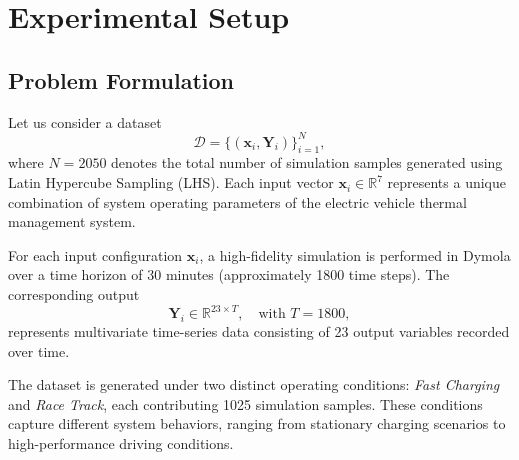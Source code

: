 \chapter{Experimental Setup}


\section{Problem Formulation}

Let us consider a dataset 
\[
\mathcal{D} = \{(\mathbf{x}_i, \mathbf{Y}_i)\}_{i=1}^{N},
\]
where \( N = 2050 \) denotes the total number of simulation samples generated using Latin Hypercube Sampling (LHS). Each input vector \( \mathbf{x}_i \in \mathbb{R}^7 \) represents a unique combination of system operating parameters of the electric vehicle thermal management system.

For each input configuration \( \mathbf{x}_i \), a high-fidelity simulation is performed in Dymola over a time horizon of 30 minutes (approximately 1800 time steps). The corresponding output 
\[
\mathbf{Y}_i \in \mathbb{R}^{23 \times T}, \quad \text{with } T = 1800,
\]
represents multivariate time-series data consisting of 23 output variables recorded over time.

The dataset is generated under two distinct operating conditions: \textit{Fast Charging} and \textit{Race Track}, each contributing 1025 simulation samples. These conditions capture different system behaviors, ranging from stationary charging scenarios to high-performance driving conditions.

